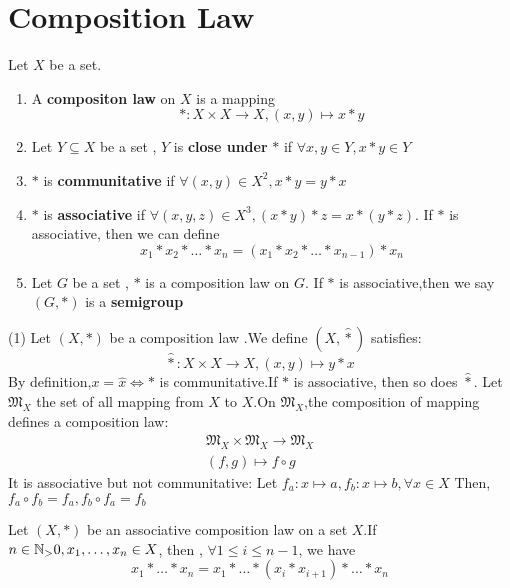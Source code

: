 \documentclass{book}
\numberwithin{equation}{section}
\begin{document}
\section{Composition Law}
\begin{definitionenv}
    Let $X$ be a set.
    \begin{enumerate}[ (i)]
        \item A \textbf{compositon law} on $X$ is a mapping
        $$*:X\times X\rightarrow X,(x,y)\mapsto x * y$$
        \item Let $Y\subseteq X$ be a set , $Y$ is \textbf{close under } $*$ if $\forall x,y \in Y, x*y\in Y$
        \item $*$ is \textbf{communitative} if $\forall (x,y)\in X^2,x*y=y*x$
        \item $*$ is \textbf{associative} if $\forall (x,y,z)\in X^3,(x*y)*z=x*(y*z)$.
        If $*$ is associative, then we can define
    $$x_1*x_2*\dots *x_n=(x_1*x_2*\dots *x_{n-1})*x_n$$
    \item Let $G$ be a set , $*$ is a composition law on $G$. If $*$ is associative,then we say $(G,*)$ is a \textbf{semigroup}
    \end{enumerate}
    
    

\end{definitionenv}
\begin{exampleenv}
    \quad
    \newline
    (1) Let $(X,*)$ be a composition law .We define $(X,\hat{*})$ satisfies:
    $$\hat{*}:X\times X\rightarrow X, (x,y)\mapsto y*x$$
    By definition,$x=\hat{x}\Leftrightarrow *$ is communitative.If $*$ is associative, then so does $\hat{*}$.
    Let $\mathfrak{M} _X$ the set of all mapping from $X$ to $X$.On $\mathfrak{M} _X$,the composition of mapping defines a composition law:
    $$\begin{matrix}
\mathfrak{M} _X\times \mathfrak{M} _X\rightarrow\mathfrak{M} _X \\
(f,g)\mapsto f\circ g

\end{matrix}$$
It is associative but not communitative:
\newline
Let $f_a:x\mapsto a ,f_b:x\mapsto b ,\forall x\in X$ Then, $f_a\circ f_b=f_a,f_b\circ f_a=f_b$
\end{exampleenv}
\begin{propositionenv}
    Let $(X,*)$ be an associative composition law on a set $X$.If $n\in \NN_>0,x_1,\dots,x_n\in X$, then , $\forall 1\le i\le n-1$, we have 
    $$x_1*\dots *x_n=x_1*\dots *(x_i*x_{i+1})*\dots *x_n$$
\end{propositionenv}
\end{document}
